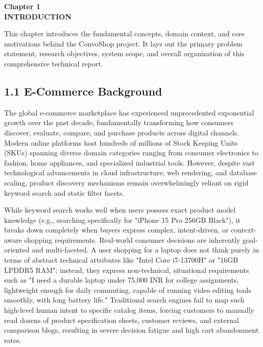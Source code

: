 \documentclass[12pt,a4paper]{article}
\newif\iffrontmatterborder
\begin{document}
\newpage
{}
\pagestyle{mainmatter}
\frontmatterborderfalse

\label{chap:1}
\begin{center}
{\fontsize{14}{17}\bfseries Chapter 1\\[6pt]}
{\fontsize{16}{20}\bfseries INTRODUCTION\\[10pt]}
\end{center}

This chapter introduces the fundamental concepts, domain context, and core motivations behind the ConvoShop project. It lays out the primary problem statement, research objectives, system scope, and overall organization of this comprehensive technical report.

\subsection*{1.1 E-Commerce Background}
\label{sec:1.1}
The global e-commerce marketplace has experienced unprecedented exponential growth over the past decade, fundamentally transforming how consumers discover, evaluate, compare, and purchase products across digital channels. Modern online platforms host hundreds of millions of Stock Keeping Units (SKUs) spanning diverse domain categories ranging from consumer electronics to fashion, home appliances, and specialized industrial tools. However, despite vast technological advancements in cloud infrastructure, web rendering, and database scaling, product discovery mechanisms remain overwhelmingly reliant on rigid keyword search and static filter facets.

While keyword search works well when users possess exact product model knowledge (e.g., searching specifically for "iPhone 15 Pro 256GB Black"), it breaks down completely when buyers express complex, intent-driven, or context-aware shopping requirements. Real-world consumer decisions are inherently goal-oriented and multi-faceted. A user shopping for a laptop does not think purely in terms of abstract technical attributes like "Intel Core i7-13700H" or "16GB LPDDR5 RAM"; instead, they express non-technical, situational requirements such as "I need a durable laptop under 75,000 INR for college assignments, lightweight enough for daily commuting, capable of running video editing tools smoothly, with long battery life." Traditional search engines fail to map such high-level human intent to specific catalog items, forcing customers to manually read dozens of product specification sheets, customer reviews, and external comparison blogs, resulting in severe decision fatigue and high cart abandonment rates.
\end{document}

